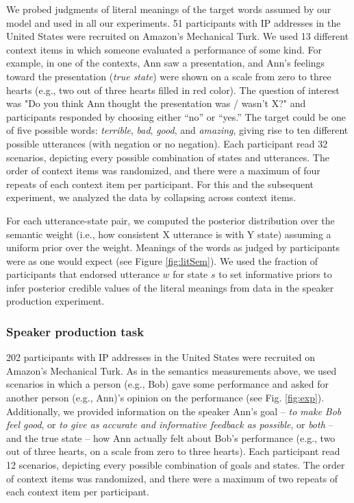 \documentclass[12pt]{article}
\begin{document}
We probed judgments of literal meanings of the target words assumed by our model and used in all our experiments. 
51 participants with IP addresses in the United States were recruited on Amazon's Mechanical Turk. 
We used 13 different context items in which someone evaluated a performance of some kind. 
For example, in one of the contexts, Ann saw a presentation, and Ann's feelings toward the presentation (\emph{true state}) were shown on a scale from zero to three hearts 
(e.g., two out of three hearts filled in red color). 
The question of interest was "Do you think Ann thought the presentation was / wasn't X?" and participants responded by choosing either \enquote{no} or \enquote{yes.}  
The target could be one of five possible words: \emph{terrible}, \emph{bad}, \emph{good}, and \emph{amazing}, giving rise to ten different possible utterances (with negation or no negation). 
Each participant read 32 scenarios, depicting every possible combination of states and utterances. 
The order of context items was randomized, and there were a maximum of four repeats of each context item per participant. 
For this and the subsequent experiment, we analyzed the data by collapsing across context items. 

For each utterance-state pair, we computed the posterior distribution over the semantic weight 
(i.e., how consistent X utterance is with Y state) assuming a uniform prior over the weight.
Meanings of the words as judged by participants were as one would expect (see Figure \ref{fig:litSem}). 
We used the fraction of participants that endorsed utterance $w$ for state $s$ to set informative priors to infer posterior credible values of the literal meanings from data in the speaker production experiment.

\subsubsection*{Speaker production task}

202 participants with IP addresses in the United States were recruited on Amazon's Mechanical Turk.
As in the semantics measurements above, we used scenarios in which a person (e.g., Bob) gave some performance and asked for another person (e.g., Ann)'s opinion on the performance (see Fig. \ref{fig:exp}). 
Additionally, we provided information on the speaker Ann's goal -- \emph{to make Bob feel good}, or \emph{to give as accurate and informative feedback as possible}, or \emph{both} -- 
and the true state -- how Ann actually felt about Bob's performance (e.g., two out of three hearts, on a scale from zero to three hearts). 
Each participant read 12 scenarios, depicting every possible combination of goals and states. 
The order of context items was randomized, and there were a maximum of two repeats of each context item per participant.
\end{document}
